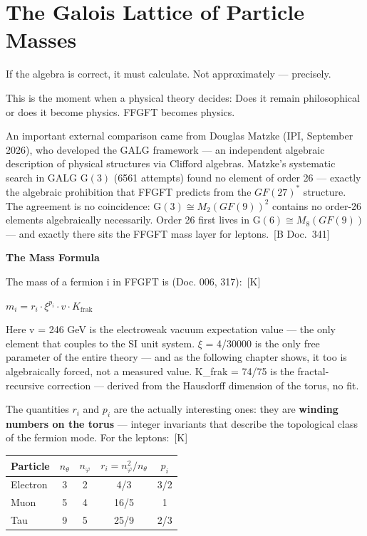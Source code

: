 \documentclass[11pt,oneside]{book}
\newcommand{\status}[1]{\penalty10000\,{\scriptsize\textcolor{gray!60}{[#1]}}}
\begin{document}
\chapter{The Galois Lattice of Particle Masses}

If the algebra is correct, it must calculate. Not approximately — precisely.

This is the moment when a physical theory decides: Does it remain
philosophical or does it become physics. FFGFT becomes physics.

An important external comparison came from Douglas Matzke (IPI, September
2026), who developed the GALG framework — an independent algebraic
description of physical structures via Clifford algebras. Matzke's
systematic search in GALG G$(3)$ (6561 attempts) found no element of order 26
— exactly the algebraic prohibition that FFGFT predicts from the $GF(27)^*$
structure. The agreement is no coincidence: G$(3) \cong M_2(GF(9))^2$ contains
no order-26 elements algebraically necessarily. Order 26 first lives in
G$(6) \cong M_8(GF(9))$ — and exactly there sits the FFGFT mass layer for
leptons. \status{B Doc.~341}

\textbf{The Mass Formula}

The mass of a fermion i in FFGFT is (Doc. 006, 317): \status{K}

$m_i = r_i \cdot \xi^{p_i} \cdot v \cdot K_\text{frak}$

Here v = 246 GeV is the electroweak vacuum expectation value — the only
element that couples to the SI unit system. $\xi$ = 4/30000 is the only free
parameter of the entire theory — and as the following chapter shows, it too
is algebraically forced, not a measured value. K\_frak = 74/75 is the
fractal-recursive correction — derived from the Hausdorff dimension of the
torus, no fit.

The quantities $r_i$ and $p_i$ are the actually interesting ones: they are
\textbf{winding numbers on the torus} — integer invariants that describe the
topological class of the fermion mode. For the leptons: \status{K}

\begin{center}
\small
\begin{tabular}{lcccc}
\toprule
Particle & $n_\theta$ & $n_\varphi$ & $r_i = n_\varphi^2/n_\theta$ & $p_i$ \\
\midrule
Electron & 3 & 2 & 4/3 & 3/2 \\
Muon & 5 & 4 & 16/5 & 1 \\
Tau & 9 & 5 & 25/9 & 2/3 \\
\bottomrule
\end{tabular}
\end{center}
\end{document}
